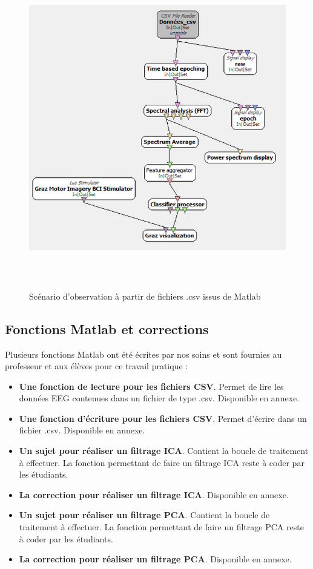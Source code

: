 \begin{itemize}
\begin{figure}[h]
					\centering\includegraphics[height=14cm]{images/scenario_2_2.png}
					\caption{Scénario d'observation à partir de fichiers .csv issus de Matlab}
					\label{obs2}
				\end{figure}
	\smallbreak
\end{itemize}

\subsection{Fonctions Matlab et corrections}

Plusieurs fonctions Matlab ont été écrites par nos soins et sont fournies au professeur et aux élèves pour ce travail pratique :

\begin{itemize}
	\item \textbf{Une fonction de lecture pour les fichiers CSV}. Permet de lire les données EEG contenues dans un fichier de type .csv. Disponible en annexe.
	\item \textbf{Une fonction d'écriture pour les fichiers CSV}. Permet d'écrire dans un fichier .csv. Disponible en annexe.
	\item \textbf{Un sujet pour réaliser un filtrage ICA}. Contient la boucle de traitement à effectuer. La fonction permettant de faire un filtrage ICA reste à coder par les étudiants.
	\item \textbf{La correction pour réaliser un filtrage ICA}. Disponible en annexe.
	\item \textbf{Un sujet pour réaliser un filtrage PCA}. Contient la boucle de traitement à effectuer. La fonction permettant de faire un filtrage PCA reste à coder par les étudiants.
	\item \textbf{La correction pour réaliser un filtrage PCA}. Disponible en annexe.
\end{itemize}


